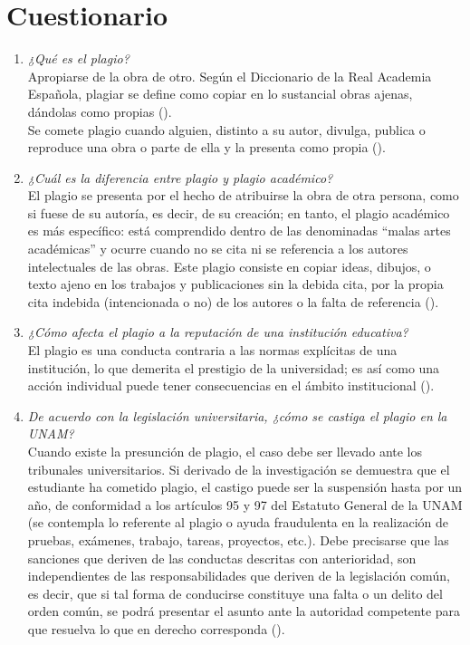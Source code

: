 \documentclass[a4paper]{article} %
\begin{document}
    \section{Cuestionario}
    \begin{enumerate}
        \item \textit{¿Qué es el plagio?} \\
        Apropiarse de la obra de otro. Según el Diccionario de la Real Academia Española, plagiar se define como copiar en lo sustancial obras ajenas, dándolas como propias (\cite{definicion}). \\
        Se comete plagio cuando alguien, distinto a su autor, divulga, publica o reproduce una obra o parte de ella y la presenta como propia (\cite{plagioyetica}). \newline
        
        \item \textit{¿Cuál es la diferencia entre plagio y plagio académico?} \\
        El plagio se presenta por el hecho de atribuirse la obra de otra persona, como si fuese de su autoría, es decir, de su creación; en tanto, el plagio académico es más específico: está comprendido dentro de las denominadas “malas artes académicas” y ocurre cuando no se cita ni se referencia a los autores intelectuales de las obras. Este plagio consiste en copiar ideas, dibujos, o texto ajeno en los trabajos y publicaciones sin la debida cita, por la propia cita indebida (intencionada o no) de los autores o la falta de referencia (\cite{presentacionplagio}). \newline
        
        \item \textit{¿Cómo afecta el plagio a la reputación de una institución educativa?} \\
        El plagio es una conducta contraria a las normas explícitas de una institución, lo que demerita el prestigio de la universidad; es así como una acción individual puede tener consecuencias en el ámbito institucional (\cite{plagioyetica}). \newline
        
        \item \textit{De acuerdo con la legislación universitaria, ¿cómo se castiga el plagio en la UNAM?} \\
        Cuando existe la presunción de plagio, el caso debe ser llevado ante los tribunales universitarios. Si derivado de la investigación se demuestra que el estudiante ha cometido plagio, el castigo puede ser la suspensión hasta por un año, de conformidad a los artículos 95 y 97 del Estatuto General de la UNAM (se contempla lo referente al plagio o ayuda fraudulenta en la realización de pruebas, exámenes, trabajo, tareas, proyectos, etc.). Debe precisarse que las sanciones que deriven de las conductas descritas con anterioridad, son independientes de las responsabilidades que deriven de la legislación común, es decir, que si tal forma de conducirse constituye una falta o un delito del orden común, se podrá presentar el asunto ante la autoridad competente para que resuelva lo que en derecho corresponda (\cite{guiaderecho}). \newline
        

\end{enumerate}
\end{document}
